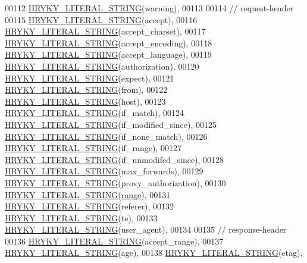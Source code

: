 \begin{DoxyCode}
00112         \hyperlink{common_8h_a9ab2728caa46163f328bd32fe4d9ff12}{HRYKY_LITERAL_STRING}(warning),
00113 
00114         \textcolor{comment}{// request-header}
00115         \hyperlink{common_8h_a9ab2728caa46163f328bd32fe4d9ff12}{HRYKY_LITERAL_STRING}(accept),
00116         \hyperlink{common_8h_a9ab2728caa46163f328bd32fe4d9ff12}{HRYKY_LITERAL_STRING}(accept\_charset),
00117         \hyperlink{common_8h_a9ab2728caa46163f328bd32fe4d9ff12}{HRYKY_LITERAL_STRING}(accept\_encoding),
00118         \hyperlink{common_8h_a9ab2728caa46163f328bd32fe4d9ff12}{HRYKY_LITERAL_STRING}(accept\_language),
00119         \hyperlink{common_8h_a9ab2728caa46163f328bd32fe4d9ff12}{HRYKY_LITERAL_STRING}(authorization),
00120         \hyperlink{common_8h_a9ab2728caa46163f328bd32fe4d9ff12}{HRYKY_LITERAL_STRING}(expect),
00121         \hyperlink{common_8h_a9ab2728caa46163f328bd32fe4d9ff12}{HRYKY_LITERAL_STRING}(from),
00122         \hyperlink{common_8h_a9ab2728caa46163f328bd32fe4d9ff12}{HRYKY_LITERAL_STRING}(host),
00123         \hyperlink{common_8h_a9ab2728caa46163f328bd32fe4d9ff12}{HRYKY_LITERAL_STRING}(if\_match),
00124         \hyperlink{common_8h_a9ab2728caa46163f328bd32fe4d9ff12}{HRYKY_LITERAL_STRING}(if\_modified\_since),
00125         \hyperlink{common_8h_a9ab2728caa46163f328bd32fe4d9ff12}{HRYKY_LITERAL_STRING}(if\_none\_match),
00126         \hyperlink{common_8h_a9ab2728caa46163f328bd32fe4d9ff12}{HRYKY_LITERAL_STRING}(if\_range),
00127         \hyperlink{common_8h_a9ab2728caa46163f328bd32fe4d9ff12}{HRYKY_LITERAL_STRING}(if\_unmodifed\_since),
00128         \hyperlink{common_8h_a9ab2728caa46163f328bd32fe4d9ff12}{HRYKY_LITERAL_STRING}(max\_forwards),
00129         \hyperlink{common_8h_a9ab2728caa46163f328bd32fe4d9ff12}{HRYKY_LITERAL_STRING}(proxy\_authorization),
00130         \hyperlink{common_8h_a9ab2728caa46163f328bd32fe4d9ff12}{HRYKY_LITERAL_STRING}(\hyperlink{namespacehryky_a6093192359bc9630d58d6158bd0178f4}{range}),
00131         \hyperlink{common_8h_a9ab2728caa46163f328bd32fe4d9ff12}{HRYKY_LITERAL_STRING}(referer),
00132         \hyperlink{common_8h_a9ab2728caa46163f328bd32fe4d9ff12}{HRYKY_LITERAL_STRING}(te),
00133         \hyperlink{common_8h_a9ab2728caa46163f328bd32fe4d9ff12}{HRYKY_LITERAL_STRING}(user\_agent),
00134 
00135         \textcolor{comment}{// response-header}
00136         \hyperlink{common_8h_a9ab2728caa46163f328bd32fe4d9ff12}{HRYKY_LITERAL_STRING}(accept\_range),
00137         \hyperlink{common_8h_a9ab2728caa46163f328bd32fe4d9ff12}{HRYKY_LITERAL_STRING}(age),
00138         \hyperlink{common_8h_a9ab2728caa46163f328bd32fe4d9ff12}{HRYKY_LITERAL_STRING}(etag),

\end{DoxyCode}
